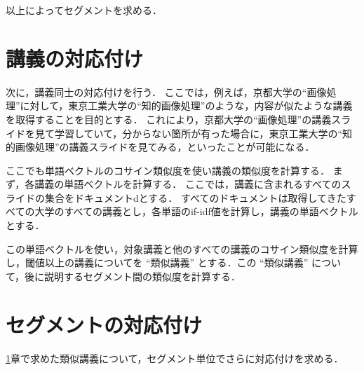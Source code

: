 \documentclass{js}
\begin{document}
以上によってセグメントを求める．












\section{講義の対応付け}\label{sec:lecture-sim}

次に，講義同士の対応付けを行う．
ここでは，例えば，京都大学の``画像処理''に対して，東京工業大学の``知的画像処理''のような，内容が似たような講義を取得することを目的とする．
これにより，京都大学の``画像処理''の講義スライドを見て学習していて，分からない箇所が有った場合に，東京工業大学の``知的画像処理''の講義スライドを見てみる，といったことが可能になる．

ここでも単語ベクトルのコサイン類似度を使い講義の類似度を計算する．
まず，各講義の単語ベクトルを計算する．
ここでは，講義に含まれるすべてのスライドの集合をドキュメントdとする．
すべてのドキュメントは取得してきたすべての大学のすべての講義とし，各単語のif-idf値を計算し，講義の単語ベクトルとする．

この単語ベクトルを使い，対象講義と他のすべての講義のコサイン類似度を計算し，閾値以上の講義についてを ``類似講義'' とする．この ``類似講義'' について，後に説明するセグメント間の類似度を計算する．

\section{セグメントの対応付け}\label{sec:segment-sim}

\ref{sec:lecture-sim}章で求めた類似講義について，セグメント単位でさらに対応付けを求める．
\end{document}
